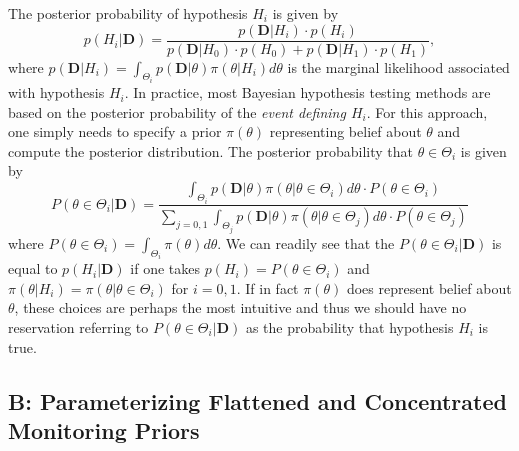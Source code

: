 \documentclass[12pt]{article}
\begin{document}
The posterior probability of hypothesis $H_i$ is given by 
\begin{equation}\label{eq:equation1}
p(H_i|\mathbf{D})=\frac{p(\mathbf{D}|H_i)\cdot p(H_i)}{p(\mathbf{D}|H_0)\cdot p(H_0)+p(\mathbf{D}|H_1)\cdot p(H_1)},
\end{equation}
where $p(\mathbf{D}|H_i) = \int_{\Theta_i} p(\mathbf{D}|\theta)\pi(\theta|H_i)d\theta$ is the marginal likelihood associated with hypothesis $H_i$.
%
In practice, most Bayesian hypothesis testing methods are based on the posterior probability of the \textit{event defining $H_i$}.
%
For this approach, one simply needs to specify a prior $\pi\left(\theta\right)$ representing belief about $\theta$ and compute the posterior distribution.
%
The posterior probability that $\theta\in\Theta_i$ is given by
\begin{equation}\label{eq:equation2}
P(\theta\in\Theta_i|\mathbf{D})
=\frac{\int_{\Theta_i} p(\mathbf{D}|\theta)\pi (\theta|\theta\in\Theta_i)d\theta\cdot P(\theta\in\Theta_i)}
      { \sum_{j=0,1} \int_{\Theta_j}p(\mathbf{D}|\theta)\pi (\theta|\theta\in\Theta_j)d\theta\cdot P(\theta\in\Theta_j) }
\end{equation}
where $P(\theta\in\Theta_i)=\int_{\Theta_i}\pi(\theta)d\theta$. 
%
We can readily see that the $P(\theta\in\Theta_i|\mathbf{D})$ is equal to $p(H_i|\mathbf{D})$ if one takes
$p(H_i) =P(\theta\in\Theta_i)$ and $\pi\left(\theta \big| H_i\right) = \pi\left(\theta\big|\theta \in \Theta_i\right)$ for $i=0,1$.
%
If in fact $\pi\left(\theta\right)$ does represent belief about $\theta$, these choices are perhaps the most intuitive and thus 
we should have no reservation referring to $P(\theta\in\Theta_i|\mathbf{D})$ as the probability that hypothesis $H_i$ is true.
\subsection*{B: Parameterizing Flattened and Concentrated Monitoring Priors}\label{sec:gen_normal_details}
\end{document}
